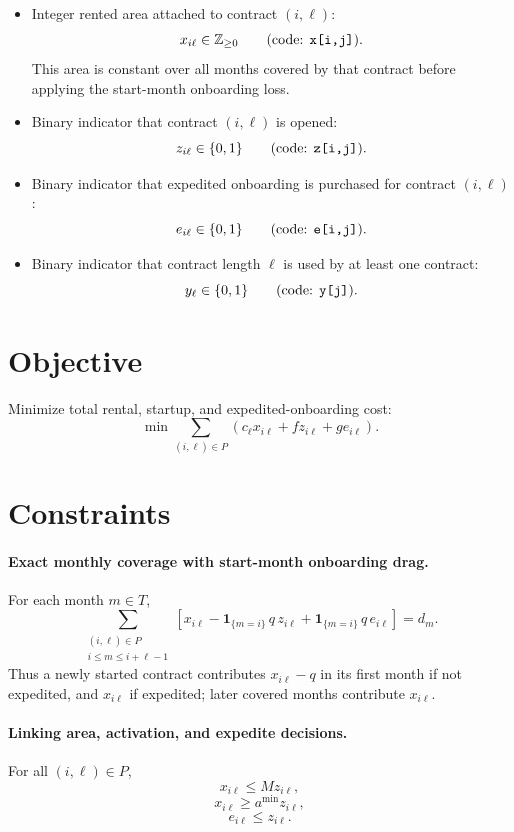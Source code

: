 \begin{itemize}
\item Integer rented area attached to contract $(i,\ell)$:
\[
x_{i\ell}\in \mathbb{Z}_{\ge 0}
\qquad\text{(code: \texttt{x[i,j]})}.
\]
This area is constant over all months covered by that contract before applying the start-month onboarding loss.
\item Binary indicator that contract $(i,\ell)$ is opened:
\[
z_{i\ell}\in\{0,1\}
\qquad\text{(code: \texttt{z[i,j]})}.
\]
\item Binary indicator that expedited onboarding is purchased for contract $(i,\ell)$:
\[
e_{i\ell}\in\{0,1\}
\qquad\text{(code: \texttt{e[i,j]})}.
\]
\item Binary indicator that contract length $\ell$ is used by at least one contract:
\[
y_{\ell}\in\{0,1\}
\qquad\text{(code: \texttt{y[j]})}.
\]
\end{itemize}

\section*{Objective}

Minimize total rental, startup, and expedited-onboarding cost:
\[
\min \sum_{(i,\ell)\in P}
\left(
c_\ell x_{i\ell} + f z_{i\ell} + g e_{i\ell}
\right).
\]

\section*{Constraints}

\paragraph{Exact monthly coverage with start-month onboarding drag.}
For each month $m\in T$,
\[
\sum_{\substack{(i,\ell)\in P\\ i\le m\le i+\ell-1}}
\left[
x_{i\ell}
-
\mathbf{1}_{\{m=i\}}\,q\,z_{i\ell}
+
\mathbf{1}_{\{m=i\}}\,q\,e_{i\ell}
\right]
= d_m.
\]
Thus a newly started contract contributes $x_{i\ell}-q$ in its first month if not expedited, and $x_{i\ell}$ if expedited; later covered months contribute $x_{i\ell}$.

\paragraph{Linking area, activation, and expedite decisions.}
For all $(i,\ell)\in P$,
\[
x_{i\ell} \le M z_{i\ell},
\]
\[
x_{i\ell} \ge a^{\min} z_{i\ell},
\]
\[
e_{i\ell} \le z_{i\ell}.
\]

